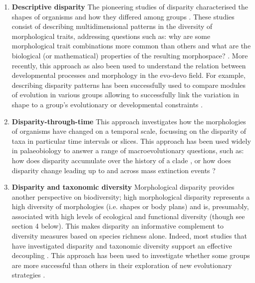 \documentclass[12pt,letterpaper]{article}
\begin{document}
\begin{enumerate}

	\item \textbf{Descriptive disparity} The pioneering studies of disparity characterised the shapes of organisms and how they differed among groups \citep{Foote1995-do, Briggs1992-pd}.
	These studies consist of describing multidimensional patterns in the diversity of morphological traits, addressing questions such as: why are some morphological trait combinations more common than others and what are the biological (or mathematical) properties of the resulting morphospace? \citep{Foote1995-do, Raup1961-vx, Gerber2017-xi}.
    More recently, this approach as also been used to understand the relation between developmental processes and morphology in the evo-devo field.
    For example, describing disparity patterns has been successfully used to compare modules of evolution in various groups \citep{goswami2010influence,bardua2019morphological} allowing to successfully link the variation in shape to a group's evolutionary or developmental constraints \citep{Hipsley2017}.

	\item \textbf{Disparity-through-time} This approach investigates how the morphologies of organisms have changed on a temporal scale, focussing on the disparity of taxa in particular time intervals or slices.
	This approach has been used widely in palaeobiology to answer a range of macroevolutionary questions, such as: how does disparity accumulate over the history of a clade \citep{Guillerme2018-uj, Wright2017-jo}, or how does disparity change leading up to and across mass extinction events \citep{Friedman2010-ve}?

	\item \textbf{Disparity and taxonomic diversity} Morphological disparity provides another perspective on biodiversity; high morphological disparity represents a high diversity of morphologies (i.e. shapes or body plans) and is, presumably, associated with high levels of ecological and functional diversity (though see section 4 below).
	This makes disparity an informative complement to diversity measures based on species richness alone. Indeed, most studies that have investigated disparity and taxonomic diversity support an effective decoupling 
	\citep[e.g.][]{Fortey1996-kt, Moyne2007-jm, Ruta2013-iy, Hopkins2013-xt}.
	This approach has been used to investigate whether some groups are more successful than others in their exploration of new evolutionary strategies \citep{Losos2011-fq}.


\end{enumerate}
\end{document}
